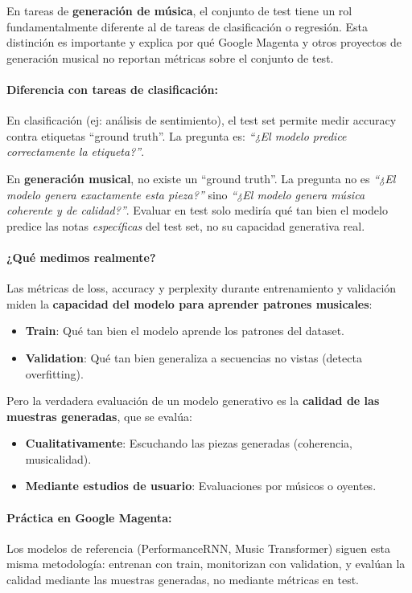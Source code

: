 \documentclass[12pt,a4paper]{article}
\begin{document}
En tareas de \textbf{generación de música}, el conjunto de test tiene un rol fundamentalmente diferente al de tareas de clasificación o regresión. Esta distinción es importante y explica por qué Google Magenta y otros proyectos de generación musical no reportan métricas sobre el conjunto de test.

\paragraph{Diferencia con tareas de clasificación:}
En clasificación (ej: análisis de sentimiento), el test set permite medir accuracy contra etiquetas ``ground truth''. La pregunta es: \textit{``¿El modelo predice correctamente la etiqueta?''}.

En \textbf{generación musical}, no existe un ``ground truth''. La pregunta no es \textit{``¿El modelo genera exactamente esta pieza?''} sino \textit{``¿El modelo genera música coherente y de calidad?''}. Evaluar en test solo mediría qué tan bien el modelo predice las notas \textit{específicas} del test set, no su capacidad generativa real.

\paragraph{¿Qué medimos realmente?}
Las métricas de loss, accuracy y perplexity durante entrenamiento y validación miden la \textbf{capacidad del modelo para aprender patrones musicales}:
\begin{itemize}
    \item \textbf{Train}: Qué tan bien el modelo aprende los patrones del dataset.
    \item \textbf{Validation}: Qué tan bien generaliza a secuencias no vistas (detecta overfitting).
\end{itemize}

Pero la verdadera evaluación de un modelo generativo es la \textbf{calidad de las muestras generadas}, que se evalúa:
\begin{itemize}
    \item \textbf{Cualitativamente}: Escuchando las piezas generadas (coherencia, musicalidad).
    \item \textbf{Mediante estudios de usuario}: Evaluaciones por músicos o oyentes.
\end{itemize}

\paragraph{Práctica en Google Magenta:}
Los modelos de referencia (PerformanceRNN, Music Transformer) siguen esta misma metodología: entrenan con train, monitorizan con validation, y evalúan la calidad mediante las muestras generadas, no mediante métricas en test.
\end{document}
